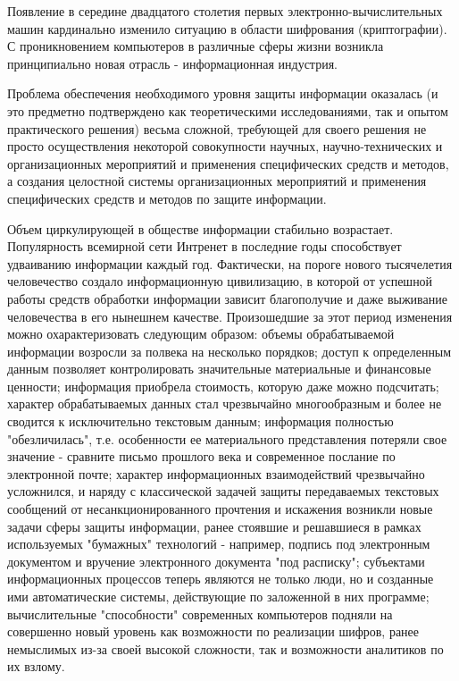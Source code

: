Появление в середине двадцатого столетия первых электронно-вычислительных машин кардинально изменило ситуацию в области шифрования (криптографии). С проникновением компьютеров в различные сферы жизни возникла принципиально новая отрасль - информационная индустрия.

Проблема обеспечения необходимого уровня защиты информации оказалась (и это предметно подтверждено как теоретическими исследованиями, так и опытом практического решения) весьма сложной, требующей для своего решения не просто осуществления некоторой совокупности научных, научно-технических и организационных мероприятий и применения специфических средств и методов, а создания целостной системы организационных мероприятий и применения специфических средств и методов по защите информации.

Объем циркулирующей в обществе информации стабильно возрастает. Популярность всемирной сети Интренет в последние годы способствует удваиванию информации каждый год. Фактически, на пороге нового тысячелетия человечество создало информационную цивилизацию, в которой от успешной работы средств обработки информации зависит благополучие и даже выживание человечества в его нынешнем качестве. Произошедшие за этот период изменения можно охарактеризовать следующим образом: объемы обрабатываемой информации возросли за полвека на несколько порядков; доступ к определенным данным позволяет контролировать значительные материальные и финансовые ценности; информация приобрела стоимость, которую даже можно подсчитать; характер обрабатываемых данных стал чрезвычайно многообразным и более не сводится к исключительно текстовым данным; информация полностью "обезличилась", т.е. особенности ее материального представления потеряли свое значение - сравните письмо прошлого века и современное послание по электронной почте; характер информационных взаимодействий чрезвычайно усложнился, и наряду с классической задачей защиты передаваемых текстовых сообщений от несанкционированного прочтения и искажения возникли новые задачи сферы защиты информации, ранее стоявшие и решавшиеся в рамках используемых "бумажных" технологий - например, подпись под электронным документом и вручение электронного документа "под расписку"; субъектами информационных процессов теперь являются не только люди, но и созданные ими автоматические системы, действующие по заложенной в них программе; вычислительные "способности" современных компьютеров подняли на совершенно новый уровень как возможности по реализации шифров, ранее немыслимых из-за своей высокой сложности, так и возможности аналитиков по их взлому.

